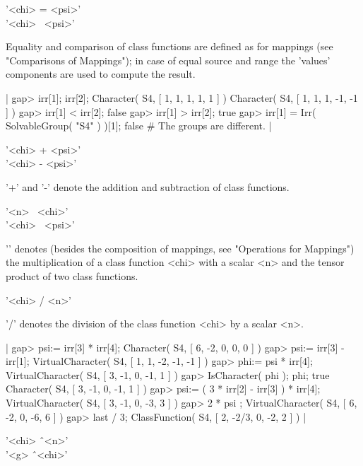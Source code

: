 
'<chi> = <psi>' \\
'<chi> \<\ <psi>' 

Equality and comparison of class functions are defined as for mappings
(see "Comparisons of Mappings"); in case of equal source and range the
'values' components are used to compute the result.

|    gap> irr[1]; irr[2];
    Character( S4, [ 1, 1, 1, 1, 1 ] )
    Character( S4, [ 1, 1, 1, -1, -1 ] )
    gap> irr[1] < irr[2];
    false
    gap> irr[1] > irr[2];
    true
    gap> irr[1] = Irr( SolvableGroup( "S4" ) )[1];
    false    # The groups are different. |

\vspace{3mm}

'<chi> + <psi>' \\
'<chi> - <psi>'

'+' and '-' denote the addition and subtraction of class functions.

\vspace{5mm}

'<n> \*\ <chi>' \\
'<chi> \*\ <psi>'

'\*' denotes (besides the composition of mappings,
see "Operations for Mappings") the multiplication of a class function
<chi> with a scalar <n> and the tensor product of two class functions.

\vspace{3mm}

'<chi> / <n>'

'/' denotes the division of the class function <chi> by a scalar <n>.

|    gap> psi:= irr[3] * irr[4];
    Character( S4, [ 6, -2, 0, 0, 0 ] )
    gap> psi:= irr[3] - irr[1];
    VirtualCharacter( S4, [ 1, 1, -2, -1, -1 ] )
    gap> phi:= psi * irr[4];
    VirtualCharacter( S4, [ 3, -1, 0, -1, 1 ] )
    gap> IsCharacter( phi ); phi;
    true
    Character( S4, [ 3, -1, 0, -1, 1 ] )
    gap> psi:= ( 3 * irr[2] - irr[3] ) * irr[4];
    VirtualCharacter( S4, [ 3, -1, 0, -3, 3 ] )
    gap> 2 * psi ;
    VirtualCharacter( S4, [ 6, -2, 0, -6, 6 ] )
    gap> last / 3;
    ClassFunction( S4, [ 2, -2/3, 0, -2, 2 ] ) |

\vspace{3mm}

'<chi> \^\ <n>' \\
'<g> \^\ <chi>'

